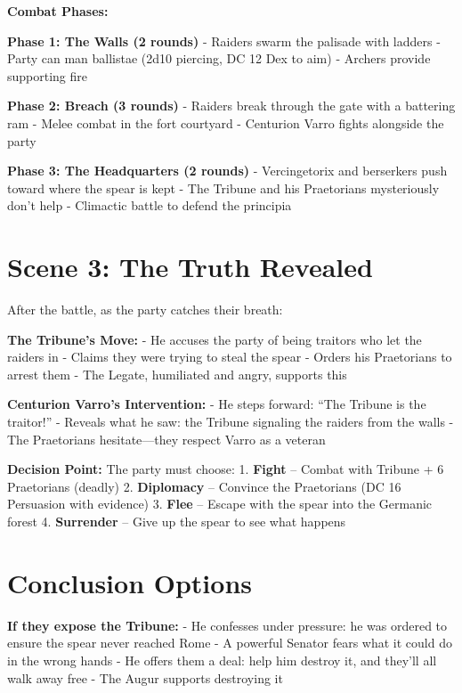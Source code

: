 \documentclass[
]{book}
\begin{document}
\textbf{Combat Phases:}

\textbf{Phase 1: The Walls (2 rounds)} - Raiders swarm the palisade with
ladders - Party can man ballistae (2d10 piercing, DC 12 Dex to aim) -
Archers provide supporting fire

\textbf{Phase 2: Breach (3 rounds)} - Raiders break through the gate
with a battering ram - Melee combat in the fort courtyard - Centurion
Varro fights alongside the party

\textbf{Phase 3: The Headquarters (2 rounds)} - Vercingetorix and
berserkers push toward where the spear is kept - The Tribune and his
Praetorians mysteriously don't help - Climactic battle to defend the
principia

\section{Scene 3: The Truth Revealed}\label{scene-3-the-truth-revealed}

After the battle, as the party catches their breath:

\textbf{The Tribune's Move:} - He accuses the party of being traitors
who let the raiders in - Claims they were trying to steal the spear -
Orders his Praetorians to arrest them - The Legate, humiliated and
angry, supports this

\textbf{Centurion Varro's Intervention:} - He steps forward: ``The
Tribune is the traitor!'' - Reveals what he saw: the Tribune signaling
the raiders from the walls - The Praetorians hesitate---they respect
Varro as a veteran

\textbf{Decision Point:} The party must choose: 1. \textbf{Fight} --
Combat with Tribune + 6 Praetorians (deadly) 2. \textbf{Diplomacy} --
Convince the Praetorians (DC 16 Persuasion with evidence) 3.
\textbf{Flee} -- Escape with the spear into the Germanic forest 4.
\textbf{Surrender} -- Give up the spear to see what happens

\section{Conclusion Options}\label{conclusion-options}

\textbf{If they expose the Tribune:} - He confesses under pressure: he
was ordered to ensure the spear never reached Rome - A powerful Senator
fears what it could do in the wrong hands - He offers them a deal: help
him destroy it, and they'll all walk away free - The Augur supports
destroying it
\end{document}
